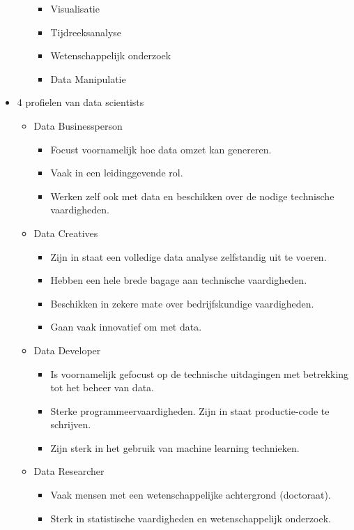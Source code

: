 \documentclass[]{tufte-book}
\providecommand{\tightlist}{%
  \setlength{\itemsep}{0pt}\setlength{\parskip}{0pt}}
\begin{document}
\begin{itemize}
\begin{itemize}
    \begin{itemize}
    \tightlist
    \item
      Visualisatie
    \item
      Tijdreeksanalyse
    \item
      Wetenschappelijk onderzoek
    \item
      Data Manipulatie
    \end{itemize}
  \end{itemize}
\item
  4 profielen van data scientists

  \begin{itemize}
  \tightlist
  \item
    Data Businessperson

    \begin{itemize}
    \tightlist
    \item
      Focust voornamelijk hoe data omzet kan genereren.
    \item
      Vaak in een leidinggevende rol.
    \item
      Werken zelf ook met data en beschikken over de nodige technische vaardigheden.
    \end{itemize}
  \item
    Data Creatives

    \begin{itemize}
    \tightlist
    \item
      Zijn in staat een volledige data analyse zelfstandig uit te voeren.
    \item
      Hebben een hele brede bagage aan technische vaardigheden.
    \item
      Beschikken in zekere mate over bedrijfskundige vaardigheden.
    \item
      Gaan vaak innovatief om met data.
    \end{itemize}
  \item
    Data Developer

    \begin{itemize}
    \tightlist
    \item
      Is voornamelijk gefocust op de technische uitdagingen met betrekking tot het beheer van data.
    \item
      Sterke programmeervaardigheden. Zijn in staat productie-code te schrijven.
    \item
      Zijn sterk in het gebruik van machine learning technieken.
    \end{itemize}
  \item
    Data Researcher

    \begin{itemize}
    \tightlist
    \item
      Vaak mensen met een wetenschappelijke achtergrond (doctoraat).
    \item
      Sterk in statistische vaardigheden en wetenschappelijk onderzoek.
    \end{itemize}
  \end{itemize}
\end{itemize}
\end{document}
